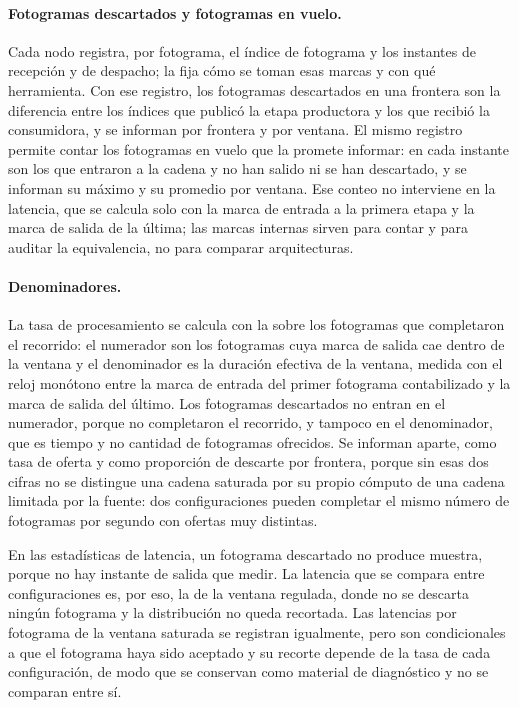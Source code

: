 \paragraph{Fotogramas descartados y fotogramas en vuelo.} Cada nodo
registra, por fotograma, el índice de fotograma y los instantes de recepción
y de despacho; la  fija cómo se toman esas
marcas y con qué herramienta. Con ese registro, los fotogramas descartados
en una frontera son la diferencia entre los índices que publicó la etapa
productora y los que recibió la consumidora, y se informan por frontera y
por ventana. El mismo registro permite contar los fotogramas en vuelo que la
 promete informar: en cada instante son los que
entraron a la cadena y no han salido ni se han descartado, y se informan su
máximo y su promedio por ventana. Ese conteo no interviene en la latencia,
que se calcula solo con la marca de entrada a la primera etapa y la marca de
salida de la última; las marcas internas sirven para contar y para auditar
la equivalencia, no para comparar arquitecturas.

\paragraph{Denominadores.} La tasa de procesamiento se calcula con la
 sobre los fotogramas que completaron el recorrido: el
numerador son los fotogramas cuya marca de salida cae dentro de la ventana y
el denominador es la duración efectiva de la ventana, medida con el reloj
monótono entre la marca de entrada del primer fotograma contabilizado y la
marca de salida del último. Los fotogramas descartados no entran en el
numerador, porque no completaron el recorrido, y tampoco en el denominador,
que es tiempo y no cantidad de fotogramas ofrecidos. Se informan aparte,
como tasa de oferta y como proporción de descarte por frontera, porque sin
esas dos cifras no se distingue una cadena saturada por su propio cómputo de
una cadena limitada por la fuente: dos configuraciones pueden completar el
mismo número de fotogramas por segundo con ofertas muy distintas.

En las estadísticas de latencia, un fotograma descartado no produce muestra,
porque no hay instante de salida que medir. La latencia que se compara entre
configuraciones es, por eso, la de la ventana regulada, donde no se descarta
ningún fotograma y la distribución no queda recortada. Las latencias por
fotograma de la ventana saturada se registran igualmente, pero son
condicionales a que el fotograma haya sido aceptado y su recorte depende de
la tasa de cada configuración, de modo que se conservan como material de
diagnóstico y no se comparan entre sí.

